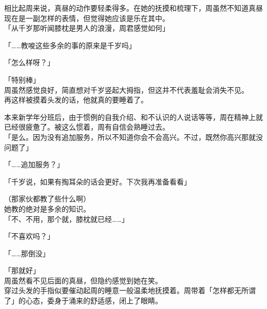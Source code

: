 相比起周来说，真昼的动作要轻柔得多。在她的抚摸和梳理下，周虽然不知道真昼现在是一副怎样的表情，但觉得她应该是乐在其中。\\

「从千岁那听闻膝枕是男人的浪漫，周君感觉如何」

「……教唆这些多余的事的原来是千岁吗」

「怎么样呀？」

「特别棒」\\

周虽然感觉良好，简直想对千岁竖起大拇指，但这并不代表羞耻会消失不见。\\

再这样被摸着头发的话，他就真的要睡着了。

本来新学年分班后，由于惯例的自我介绍、和不认识的人说话等等，周在精神上就已经很疲惫了。被这么惯着，周有自信会熟睡过去。\\

「是么。因为没有追加服务，所以不知道你会不会高兴。不过，既然你高兴那就没问题了」

「……追加服务？」

「千岁说，如果有掏耳朵的话会更好。下次我再准备看看」

（那家伙都教了些什么啊）\\

她教的绝对是多余的知识。\\

「不、不用，那个就，膝枕就已经……」

「不喜欢吗？」

「……那倒没」

「那就好」\\

周虽然看不见后面的真昼，但隐约感觉到她在笑。\\

穿过头发的手指似要催动起周的睡意一般温柔地抚摸着。周带着「怎样都无所谓了」的心态，委身于涌来的舒适感，闭上了眼睛。
